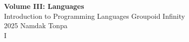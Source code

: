 \documentclass{article}
\begin{document}
\begin{titlepage}
    \centering
    \vspace*{1in}
    \Huge
    \textbf{Volume III: Languages} \\
    \vspace{0.5in}
    \Large
    Introduction to Programming Languages
    \vfill
    \Large
    Groupoid Infinity \\
    \vspace{0.2in}
2025
    \vspace{0.5in}
    \vspace{0.5in}
    \Large
    Namdak Tonpa \\
    I
\end{titlepage}


\tableofcontents
\newif\ifincludeTOC
\includeTOCfalse
\newpage \begin{standalone}     \end{standalone}
\newpage \begin{standalone}   \end{standalone}
\newpage \begin{standalone}  \end{standalone}
\newpage \begin{standalone}  \end{standalone}
\end{document}

